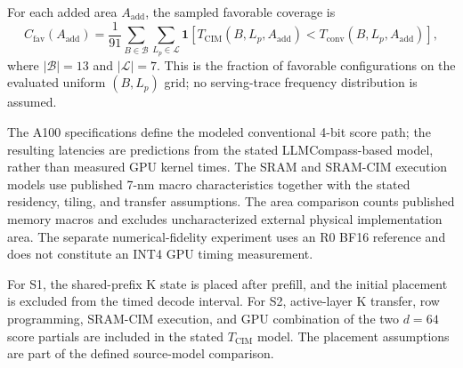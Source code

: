 For each added area $A_{\mathrm{add}}$, the sampled favorable coverage is
\begin{equation}
 C_{\mathrm{fav}}(A_{\mathrm{add}})
 =\frac{1}{91}\sum_{B\in\mathcal{B}}\sum_{L_p\in\mathcal{L}}
 \mathbf{1}\!\left[T_{\mathrm{CIM}}(B,L_p,A_{\mathrm{add}})
 <T_{\mathrm{conv}}(B,L_p,A_{\mathrm{add}})\right],
 \label{eq:tetc_grid_coverage}
\end{equation}
where $|\mathcal{B}|=13$ and $|\mathcal{L}|=7$. This is the fraction of favorable configurations on the evaluated uniform $(B,L_p)$ grid; no serving-trace frequency distribution is assumed.

The A100 specifications define the modeled conventional 4-bit score path; the resulting latencies are predictions from the stated LLMCompass-based model, rather than measured GPU kernel times. The SRAM and SRAM-CIM execution models use published 7-nm macro characteristics together with the stated residency, tiling, and transfer assumptions. The area comparison counts published memory macros and excludes uncharacterized external physical implementation area. The separate numerical-fidelity experiment uses an R0 BF16 reference and does not constitute an INT4 GPU timing measurement.

For S1, the shared-prefix K state is placed after prefill, and the initial placement is excluded from the timed decode interval. For S2, active-layer K transfer, row programming, SRAM-CIM execution, and GPU combination of the two $d=64$ score partials are included in the stated $T_{\mathrm{CIM}}$ model. The placement assumptions are part of the defined source-model comparison.

